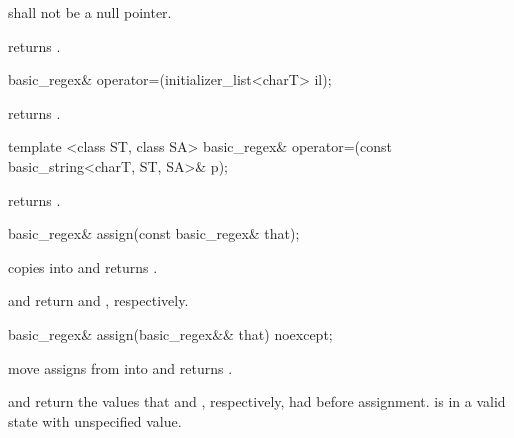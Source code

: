 \begin{itemdescr}
\pnum
\requires  {} shall not be a null pointer. 

\pnum
\effects  returns .
\end{itemdescr}

%
%
\begin{itemdecl}
basic_regex& operator=(initializer_list<charT> il);
\end{itemdecl}

\begin{itemdescr}
\pnum
\effects  returns .
\end{itemdescr}

%
%
\begin{itemdecl}
template <class ST, class SA>
  basic_regex& operator=(const basic_string<charT, ST, SA>& p); 
\end{itemdecl}

\begin{itemdescr}
\pnum
\effects  returns .
\end{itemdescr}

%
%
\begin{itemdecl}
basic_regex& assign(const basic_regex& that); 
\end{itemdecl}

\begin{itemdescr}
\pnum
\effects  copies  into  and returns .

\pnum\postconditions
{} and  return
 and , respectively.
\end{itemdescr}

%
%
\begin{itemdecl}
basic_regex& assign(basic_regex&& that) noexcept;
\end{itemdecl}

\begin{itemdescr}
\pnum
\effects  move assigns from  into  and returns .

\pnum
\postconditions {} and  return the values that
 and , respectively, had before assignment.
 is in a valid state with unspecified value.
\end{itemdescr}

